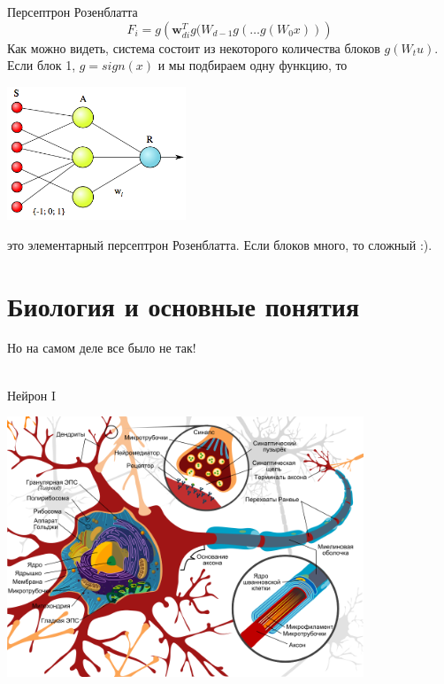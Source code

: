 \documentclass[14pt, fleqn, xcolor={dvipsnames, table}]{beamer}
\begin{document}
\begin{frame}{Персептрон Розенблатта}
\small
$$
F_i = g\left(\mathbf{w}_{di}^T g(W_{d-1}g(\ldots g(W_{0}x))\right)
$$
Как можно видеть, система состоит из некоторого количества блоков $g(W_tu)$. Если блок 1, $g = sign(x)$ и мы подбираем одну функцию, то
\begin{center}
\includegraphics[width=0.4\textwidth]{Simple_perceptron}
\end{center}
это элементарный персептрон Розенблатта. Если блоков много, то сложный :).
\end{frame}

\section{Биология и основные понятия} %
\begin{frame}{}
\begin{center}
\Huge
Но на самом деле все было не так!\\
~\\
\small
{}
\end{center}
\end{frame}

\begin{frame}{Нейрон I}
\begin{center}
\includegraphics[width=0.8\textwidth]{normal_neuron}
\end{center}
\end{frame}
\end{document}
